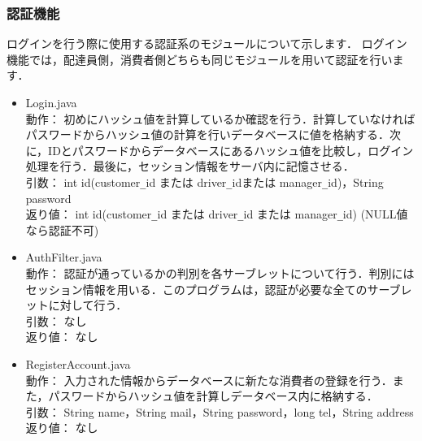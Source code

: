 \documentclass[a4j,titlepage]{jarticle}
\begin{document}
\subsubsection{認証機能}
ログインを行う際に使用する認証系のモジュールについて示します．
ログイン機能では，配達員側，消費者側どちらも同じモジュールを用いて認証を行います．
\begin{itemize}
\item Login.java\\
動作： 初めにハッシュ値を計算しているか確認を行う．計算していなければパスワードからハッシュ値の計算を行いデータベースに値を格納する．次に，IDとパスワードからデータベースにあるハッシュ値を比較し，ログイン処理を行う．最後に，セッション情報をサーバ内に記憶させる．\\
引数： int id(customer\verb|_|id または driver\verb|_|idまたは manager\verb|_|id)，String password\\
返り値： int id(customer\verb|_|id または driver\verb|_|id または manager\verb|_|id) (NULL値なら認証不可)
\item AuthFilter.java\\
動作： 認証が通っているかの判別を各サーブレットについて行う．判別にはセッション情報を用いる．このプログラムは，認証が必要な全てのサーブレットに対して行う．\\
引数： なし\\
返り値： なし
\item RegisterAccount.java\\
動作： 入力された情報からデータベースに新たな消費者の登録を行う．また，パスワードからハッシュ値を計算しデータベース内に格納する．\\
引数： String name，String mail，String password，long tel，String address\\
返り値： なし
\end{itemize}
\end{document}
